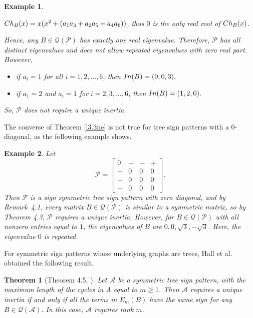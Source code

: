 \documentclass[10pt,a4paper]{amsart}
\newtheorem{theorem}{Theorem}[section]
\newtheorem{eg}{Example}[section]
\numberwithin{equation}{section}
\def\In{{\rm In}}
\def\Ch{{\rm Ch}}
\begin{document}
\begin{eg}
\begin{itemize}
			$\Ch_B(x)=x(x^2+(a_1a_3+a_2a_5+a_4a_6))$, thus $0$ is the only real root of $\Ch_B(x)$.
		\end{itemize} Hence, any $B\in \mathcal{Q}(\mathcal{P})$ has exactly one real eigenvalue. Therefore, $\mathcal{P}$ has all distinct eigenvalues and does not allow repeated eigenvalues with zero real part. However,
		\begin{itemize}
			\item[i.] if $a_i=1$ for all $i=1,2,...,6$, then $\In(B)=(0,0,3),$
			\item[ii.] if $a_1=2$ and $a_i=1$ for $i=2,3,...,6$, then $\In(B)=(1,2,0).$
		\end{itemize}
		So, $\mathcal{P}$ does not require a unique inertia. 
	\end{eg}
	
	
	
	
	
	The converse of Theorem \ref{l3.3ne} is not true for tree sign patterns with a $0$-diagonal, as the following example shows.
	\begin{eg}
		Let $$\mathcal{P}=\begin{bmatrix}
			0&+&+&+\\+&0&0&0\\+&0&0&0\\+&0&0&0
		\end{bmatrix}.$$ Then $\mathcal{P}$ is a sign symmetric tree sign pattern with zero diagonal, and by Remark~4.1\cite{2018}, every matrix $B\in\mathcal{Q}(\mathcal{P})$ is similar to a symmetric matrix, so by Theorem 4.3\cite{2001}, $\mathcal{P}$ requires a unique inertia. However, for $B\in \mathcal{Q(\mathcal{P})}$ with all nonzero entries equal to $1$, the eigenvalues of $B$ are $0,0,\sqrt{3},-\sqrt{3}$. Here, the eigenvalue $0$ is repeated.
	\end{eg}
	
	
	
	
	For symmetric sign patterns whose underlying graphs are trees, Hall et al. \cite{2001} obtained the following result.
	\begin{theorem}[Theorem 4.5, \cite{2001}]  Let $\mathcal{A}$ be a symmetric tree sign pattern, with the maximum length of the cycles in A equal to $m\geq 1$. Then $\mathcal{A}$ requires a unique inertia if and only if all the terms in $E_m(B)$ have the same sign for any $B \in \mathcal{Q}(\mathcal{A})$. In this case, $\mathcal{A}$ requires rank $m$.
	\end{theorem}
	
\end{document}
